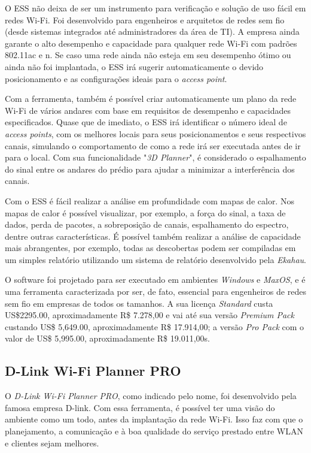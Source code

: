 \documentclass[
	12pt,				%
	openright,			%
	twoside,			%
	a4paper,			%
	english,			%
	french,				%
	spanish,			%
	brazil				%
	]{abntex2}
\begin{document}
O ESS não deixa de ser um instrumento para verificação e solução de uso fácil em redes Wi-Fi. Foi desenvolvido para engenheiros e arquitetos de redes sem fio (desde sistemas integrados até administradores da área de TI). A empresa ainda garante o alto desempenho e capacidade para qualquer rede Wi-Fi com padrões 802.11ac e n. Se caso uma rede ainda não esteja em seu desempenho ótimo ou ainda não foi implantada, o ESS irá sugerir automaticamente o devido posicionamento e as configurações ideais para o \textit{access point}.

Com a ferramenta, também é possível criar automaticamente um plano da rede Wi-Fi de vários andares com base em requisitos de desempenho e capacidades especificados. Quase que de imediato, o ESS irá identificar o número ideal de \textit{access points}, com os melhores locais para seus posicionamentos e seus respectivos canais, simulando o comportamento de como a rede irá ser executada antes de ir para o local. Com sua funcionalidade "\textit{3D Planner}", é considerado o espalhamento do sinal entre os andares do prédio para ajudar a minimizar a interferência dos canais.

Com o ESS é fácil realizar a análise em profundidade com mapas de calor. Nos mapas de calor é possível visualizar, por exemplo, a força do sinal, a taxa de dados, perda de pacotes, a sobreposição de canais, espalhamento do espectro, dentre outras características. É possível também realizar a análise de capacidade mais abrangentes, por exemplo, todas as descobertas podem ser compiladas em um simples relatório utilizando um sistema de relatório desenvolvido pela \textit{Ekahau}. 

O software foi projetado para ser executado em ambientes \textit{Windows} e \textit{MaxOS}, e é uma ferramenta caracterizada por ser, de fato, essencial para engenheiros de redes sem fio em empresas de todos os tamanhos. A sua licença \textit{Standard} custa US\$2295.00, aproximadamente R\$ 7.278,00 e vai até sua versão \textit{Premium Pack} custando US\$ 5,649.00, aproximadamente R\$ 17.914,00; a versão \textit{Pro Pack} com o valor de US\$ 5,995.00, aproximadamente R\$ 19.011,00s.


\subsection[D-Link Wi-Fi Planner PRO]{D-Link Wi-Fi Planner PRO}

O \textit{D-Link Wi-Fi Planner PRO}, como indicado pelo nome, foi desenvolvido pela famosa empresa D-link. Com essa ferramenta, é possível ter uma visão do ambiente como um todo, antes da implantação da rede Wi-Fi. Isso faz com que o planejamento, a comunicação e à boa qualidade do serviço prestado entre WLAN e clientes sejam melhores.
\end{document}
